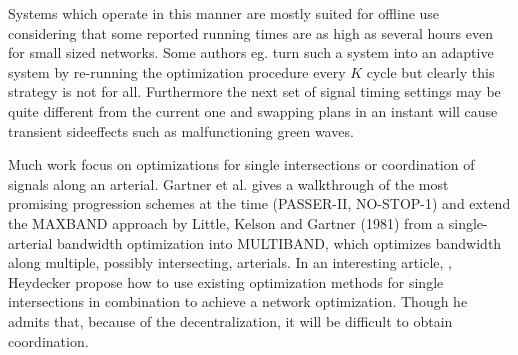 Systems which operate in this manner are mostly suited for offline use considering that some reported running times are as high as several hours even for small sized networks.
Some authors eg. \cite{16} turn such a system into an adaptive system by re-running the optimization procedure every $K$ cycle but clearly this strategy is not for all. Furthermore the next set of signal timing settings may be quite different from the current one and swapping plans in an instant will cause transient sideeffects such as malfunctioning green waves.

Much work focus on optimizations for single intersections or coordination of signals along an arterial. Gartner et al. \cite{9} gives a walkthrough of the most promising progression schemes at the time (PASSER-II, NO-STOP-1) and extend the MAXBAND approach by Little, Kelson and Gartner (1981) from a single-arterial bandwidth optimization into MULTIBAND, which optimizes bandwidth along multiple, possibly intersecting, arterials.
In an interesting article, \cite{24}, Heydecker propose how to use existing optimization methods for single intersections in combination to achieve a network optimization. Though he admits that, because of the decentralization, it will be difficult to obtain coordination.
